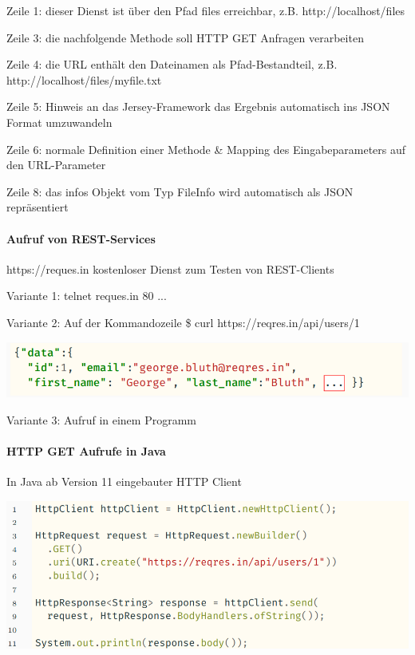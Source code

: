 \documentclass[10pt]{article}
\begin{document}
\begin{itemize*}
  \item Zeile 1: dieser Dienst ist über den Pfad files erreichbar,
  z.B. http://localhost/files
  \item Zeile 3: die nachfolgende Methode soll HTTP GET Anfragen
  verarbeiten
  \item Zeile 4: die URL enthält den Dateinamen als
  Pfad-Bestandteil, z.B.
  http://localhost/files/myfile.txt
  \item Zeile 5: Hinweis an das Jersey-Framework das Ergebnis
  automatisch ins JSON Format umzuwandeln
  \item Zeile 6: normale Definition einer Methode \& Mapping des
  Eingabeparameters auf den URL-Parameter
  \item Zeile 8: das infos Objekt vom Typ FileInfo wird
  automatisch als JSON repräsentiert
\end{itemize*}

\paragraph{Aufruf von REST-Services}

https://reques.in kostenloser Dienst zum Testen von REST-Clients
\begin{itemize*}
  \item Variante 1: telnet reques.in 80 ...
  \item Variante 2: Auf der Kommandozeile \newline
  \$ curl https://reqres.in/api/users/1
  \begin{center}
    \centering
    \includegraphics[width=0.4\linewidth]{Assets/Programmierparadigmen-code-snippet-72}
  \end{center}
  \item Variante 3: Aufruf in einem Programm
\end{itemize*}

\paragraph{HTTP GET Aufrufe in Java}

In Java ab Version 11 eingebauter HTTP Client
\begin{center}
  \includegraphics[width=0.4\linewidth]{Assets/Programmierparadigmen-code-snippet-73}
\end{center}
\end{document}
